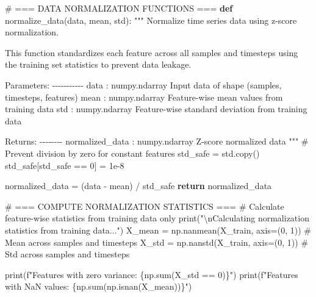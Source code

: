 \documentclass[
  letterpaper,
  DIV=11,
  numbers=noendperiod]{scrreprt}
\newenvironment{Shaded}{\begin{snugshade}}{\end{snugshade}}
\newcommand{\BuiltInTok}[1]{\textcolor[rgb]{0.00,0.23,0.31}{#1}}
\newcommand{\CharTok}[1]{\textcolor[rgb]{0.13,0.47,0.30}{#1}}
\newcommand{\CommentTok}[1]{\textcolor[rgb]{0.37,0.37,0.37}{#1}}
\newcommand{\ControlFlowTok}[1]{\textcolor[rgb]{0.00,0.23,0.31}{\textbf{#1}}}
\newcommand{\DecValTok}[1]{\textcolor[rgb]{0.68,0.00,0.00}{#1}}
\newcommand{\FloatTok}[1]{\textcolor[rgb]{0.68,0.00,0.00}{#1}}
\newcommand{\KeywordTok}[1]{\textcolor[rgb]{0.00,0.23,0.31}{\textbf{#1}}}
\newcommand{\NormalTok}[1]{\textcolor[rgb]{0.00,0.23,0.31}{#1}}
\newcommand{\OperatorTok}[1]{\textcolor[rgb]{0.37,0.37,0.37}{#1}}
\newcommand{\SpecialCharTok}[1]{\textcolor[rgb]{0.37,0.37,0.37}{#1}}
\newcommand{\SpecialStringTok}[1]{\textcolor[rgb]{0.13,0.47,0.30}{#1}}
\newcommand{\StringTok}[1]{\textcolor[rgb]{0.13,0.47,0.30}{#1}}
\begin{document}
\begin{Shaded}
\begin{Highlighting}[]
\CommentTok{\# === DATA NORMALIZATION FUNCTIONS ===}
\KeywordTok{def}\NormalTok{ normalize\_data(data, mean, std):}
    \CommentTok{"""}
\CommentTok{    Normalize time series data using z{-}score normalization.}

\CommentTok{    This function standardizes each feature across all samples and timesteps}
\CommentTok{    using the training set statistics to prevent data leakage.}

\CommentTok{    Parameters:}
\CommentTok{    {-}{-}{-}{-}{-}{-}{-}{-}{-}{-}{-}}
\CommentTok{    data : numpy.ndarray}
\CommentTok{        Input data of shape (samples, timesteps, features)}
\CommentTok{    mean : numpy.ndarray}
\CommentTok{        Feature{-}wise mean values from training data}
\CommentTok{    std : numpy.ndarray}
\CommentTok{        Feature{-}wise standard deviation from training data}

\CommentTok{    Returns:}
\CommentTok{    {-}{-}{-}{-}{-}{-}{-}{-}}
\CommentTok{    normalized\_data : numpy.ndarray}
\CommentTok{        Z{-}score normalized data}
\CommentTok{    """}
    \CommentTok{\# Prevent division by zero for constant features}
\NormalTok{    std\_safe }\OperatorTok{=}\NormalTok{ std.copy()}
\NormalTok{    std\_safe[std\_safe }\OperatorTok{==} \DecValTok{0}\NormalTok{] }\OperatorTok{=} \FloatTok{1e{-}8}

\NormalTok{    normalized\_data }\OperatorTok{=}\NormalTok{ (data }\OperatorTok{{-}}\NormalTok{ mean) }\OperatorTok{/}\NormalTok{ std\_safe}
    \ControlFlowTok{return}\NormalTok{ normalized\_data}


\CommentTok{\# === COMPUTE NORMALIZATION STATISTICS ===}
\CommentTok{\# Calculate feature{-}wise statistics from training data only}
\BuiltInTok{print}\NormalTok{(}\StringTok{"}\CharTok{\textbackslash{}n}\StringTok{Calculating normalization statistics from training data..."}\NormalTok{)}
\NormalTok{X\_mean }\OperatorTok{=}\NormalTok{ np.nanmean(X\_train, axis}\OperatorTok{=}\NormalTok{(}\DecValTok{0}\NormalTok{, }\DecValTok{1}\NormalTok{))  }\CommentTok{\# Mean across samples and timesteps}
\NormalTok{X\_std }\OperatorTok{=}\NormalTok{ np.nanstd(X\_train, axis}\OperatorTok{=}\NormalTok{(}\DecValTok{0}\NormalTok{, }\DecValTok{1}\NormalTok{))    }\CommentTok{\# Std across samples and timesteps}

\BuiltInTok{print}\NormalTok{(}\SpecialStringTok{f"Features with zero variance: }\SpecialCharTok{\{}\NormalTok{np}\SpecialCharTok{.}\BuiltInTok{sum}\NormalTok{(X\_std }\OperatorTok{==} \DecValTok{0}\NormalTok{)}\SpecialCharTok{\}}\SpecialStringTok{"}\NormalTok{)}
\BuiltInTok{print}\NormalTok{(}\SpecialStringTok{f"Features with NaN values: }\SpecialCharTok{\{}\NormalTok{np}\SpecialCharTok{.}\BuiltInTok{sum}\NormalTok{(np.isnan(X\_mean))}\SpecialCharTok{\}}\SpecialStringTok{"}\NormalTok{)}


\end{Highlighting}
\end{Shaded}
\end{document}
